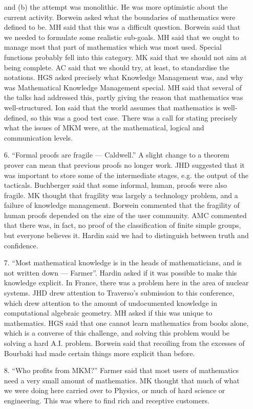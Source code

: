 \documentclass[11pt, a4paper]{article}
\begin{document}
\begin{enumerate}
and (b) the attempt was monolithic. He was more optimistic about the
current activity. Borwein asked what the boundaries of mathematics were
defined to be. MH said that this was a difficult question. Borwein said
that we needed to formulate some realistic sub-goals. MH said that we ought
to manage most that part of mathematics which was most used. Special
functions probably fell into this category. MK said that we should not aim
at being complete. AC said that we should try, at least, to standardise the
notations. HGS asked precisely what Knowledge Management was, and why was
Mathematical Knowledge Management special. MH
said that several of the talks had addressed this, partly giving the reason
that mathematics was well-structured. Ion said that the world assumes that
mathematics is well-defined, so this was a good test case. There was a call
for stating precisely what the issues of MKM were, at the mathematical,
logical and communication levels.
\item[6.]``Formal proofs are fragile --- Caldwell.'' A slight change to a
theorem prover can mean that previous proofs no longer work. JHD suggested
that it was important to store some of the intermediate stages, e.g. the
output of the tacticals. Buchberger said that some informal, human, proofs
were also fragile. MK thought that fragility was largely a technology
problem, and a failure of knowledge management. Borwein commented that the
fragility of human proofs depended on the size of the user community. AMC
commented that there was, in fact, no proof of the classification of finite
simple groups, but everyone believes it. Hardin said we had to distinguish
between truth and confidence.
\item[7.]``Most mathematical knowledge is in the heads of mathematicians,
and is not written down --- Farmer''. Hardin asked if it was possible to
make this knowledge explicit. In France, there was a problem here in the
area of nuclear systems. JHD drew attention to Traverso's submission to
this conference, which drew attention to the amount of undocumented
knowledge in computational algebraic geometry. MH asked if this was unique
to mathematics. HGS said that one cannot learn mathematics from books
alone, which is a converse of this challenge, and solving this problem
would be solving a hard A.I. problem. Borwein said that recoiling from the
excesses of Bourbaki had made certain things more explicit than before.
\item[8.]``Who profits from MKM?'' Farmer said that most users of
mathematics need a very small amount of mathematics. MK thought that much
of what we were doing here carried over to Physics, or much of hard science
or engineering. This was where to find rich and receptive customers. 
\end{enumerate}
\end{document}
